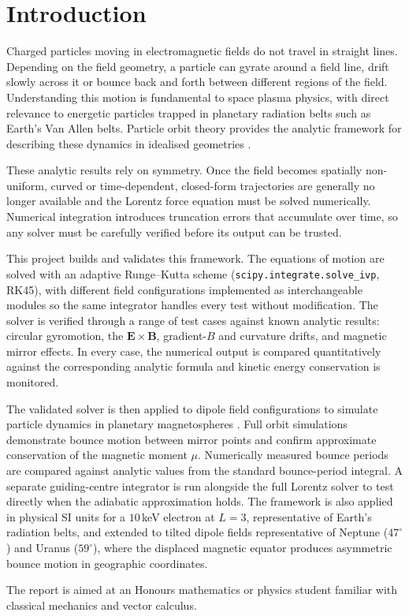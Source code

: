 \chapter{Introduction}
\label{ch:intro}

Charged particles moving in electromagnetic fields do not travel in straight lines. Depending on the field geometry, a particle can gyrate around a field line, drift slowly across it or bounce back and forth between different regions of the field. Understanding this motion is fundamental to space plasma physics, with direct relevance to energetic particles trapped in planetary radiation belts such as Earth's Van Allen belts. Particle orbit theory provides the analytic framework for describing these dynamics in idealised geometries \citep{boyd2003}.

These analytic results rely on symmetry. Once the field becomes spatially non-uniform, curved or time-dependent, closed-form trajectories are generally no longer available and the Lorentz force equation must be solved numerically. Numerical integration introduces truncation errors that accumulate over time, so any solver must be carefully verified before its output can be trusted.

This project builds and validates this framework. The equations of motion are solved with an adaptive Runge--Kutta scheme
(\texttt{scipy.integrate.solve\_ivp}, RK45), with different field configurations implemented as interchangeable modules so the same integrator handles every test without modification. The solver is verified through a range of test cases against known analytic results: circular gyromotion, the $\mathbf{E} \times \mathbf{B}$,
gradient-$B$ and curvature drifts, and magnetic mirror effects. In every case, the numerical output is compared quantitatively against the corresponding analytic formula and kinetic energy conservation is monitored.

The validated solver is then applied to dipole field configurations to simulate particle dynamics in planetary magnetospheres \citep{baumjohann1996}. Full orbit simulations demonstrate bounce motion between mirror points and confirm approximate conservation of the magnetic moment $\mu$. Numerically measured bounce periods are compared against analytic values from the standard bounce-period integral. A
separate guiding-centre integrator is run alongside the full Lorentz solver to test directly when the adiabatic approximation holds. The framework is also applied in physical SI units for a $10\,$keV electron at $L = 3$, representative of Earth's radiation belts, and extended to tilted dipole fields representative of Neptune ($47^\circ$) and Uranus ($59^\circ$), where the displaced magnetic equator produces asymmetric bounce motion in geographic coordinates.

The report is aimed at an Honours mathematics or physics student familiar with classical mechanics and vector calculus.
